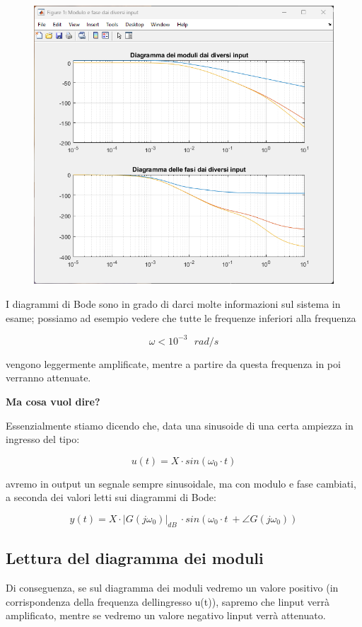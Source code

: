 \documentclass[
]{article}
\begin{document}
\begin{figure}
    \centering
    \includegraphics[width=0.75\linewidth]{images/image-20240118150144374.png}
    
    
\end{figure}

I diagrammi di Bode sono in grado di darci molte informazioni sul
sistema in esame; possiamo ad esempio vedere che tutte le frequenze
inferiori alla frequenza

\[\omega < 10^{-3} \ \ \ rad/s\]

vengono leggermente amplificate, mentre a partire da questa frequenza in
poi verranno attenuate.

\textbf{Ma cosa vuol dire?}

Essenzialmente stiamo dicendo che, data una sinusoide di una certa
ampiezza in ingresso del tipo:

\[u(t) = X \cdot sin(\omega_{0} \cdot t)\]

avremo in output un segnale sempre sinusoidale, ma con modulo e fase
cambiati, a seconda dei valori letti sui diagrammi di Bode:

\[y(t) = X \cdot |G(j\omega_{0})|_{dB} \ \cdot sin(\omega_{0} \cdot t \ + \angle{G(j\omega_{0})})\]

\newpage

\hypertarget{lettura-del-diagramma-dei-moduli}{%
\subsection{Lettura del diagramma dei
moduli}\label{lettura-del-diagramma-dei-moduli}}

Di conseguenza, se sul diagramma dei moduli vedremo un valore positivo
(in corrispondenza della frequenza dell\textquotesingle ingresso u(t)),
sapremo che l\textquotesingle input verrà amplificato, mentre se vedremo
un valore negativo l\textquotesingle input verrà attenuato.
\end{document}
